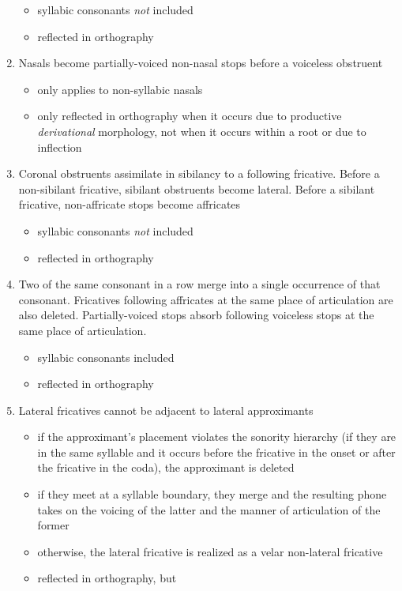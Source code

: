 \documentclass[a4paper,11pt,oneside,openany]{memoir}
\begin{document}
\begin{enumerate}
    \begin{itemize}
        \item syllabic consonants \emph{not} included
        \item reflected in orthography
    \end{itemize}
    \item Nasals become partially-voiced non-nasal stops before a voiceless obstruent
    \begin{itemize}
        \item only applies to non-syllabic nasals
        \item only reflected in orthography when it occurs due to productive \emph{derivational} morphology, not when it occurs within a root or due to inflection
    \end{itemize}
    \item Coronal obstruents assimilate in sibilancy to a following fricative. Before a non-sibilant fricative, sibilant obstruents become lateral. Before a sibilant fricative, non-affricate stops become affricates
    \begin{itemize}
        \item syllabic consonants \emph{not} included
        \item reflected in orthography
    \end{itemize}
    \item Two of the same consonant in a row merge into a single occurrence of that consonant. Fricatives following affricates at the same place of articulation are also deleted. Partially-voiced stops absorb following voiceless stops at the same place of articulation.
    \begin{itemize}
        \item syllabic consonants included
        \item reflected in orthography
    \end{itemize}
    \item Lateral fricatives cannot be adjacent to lateral approximants
    \begin{itemize}
        \item if the approximant's placement violates the sonority hierarchy (if they are in the same syllable and it occurs before the fricative in the onset or after the fricative in the coda), the approximant is deleted
        \item if they meet at a syllable boundary, they merge and the resulting phone takes on the voicing of the latter and the manner of articulation of the former
        \item otherwise, the lateral fricative is realized as a velar non-lateral fricative
        \item reflected in orthography, but 
    \end{itemize}
\end{enumerate}
\end{document}

